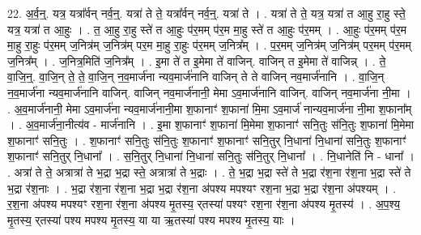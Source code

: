 \documentclass[17pt]{extarticle}
\begin{document}
22. अ॒र्व॒न्॒. यत्र॒ यत्रा᳚र्वन् नर्व॒न्॒. यत्रा॑ ते ते॒ यत्रा᳚र्वन् नर्व॒न्॒. यत्रा॑ ते । . यत्रा॑ ते ते॒ यत्र॒ यत्रा॑ त आ॒हु रा॒हु स्ते॒ यत्र॒ यत्रा॑ त आ॒हुः । . त॒ आ॒हु रा॒हु स्ते॑ त आ॒हुः प॑र॒मम् प॑र॒म मा॒हु स्ते॑ त आ॒हुः प॑र॒मम् । . आ॒हुः प॑र॒मम् प॑र॒म मा॒हु रा॒हुः प॑र॒मम् ज॒नित्र॑म् ज॒नित्र॑म् पर॒म मा॒हु रा॒हुः प॑र॒मम् ज॒नित्र᳚म् । . प॒र॒मम् ज॒नित्र॑म् ज॒नित्र॑म् पर॒मम् प॑र॒मम् ज॒नित्र᳚म् । . ज॒नित्र॒मिति॑ ज॒नित्र᳚म् । . इ॒मा ते॑ त इ॒मेमा ते॑ वाजिन्. वाजिन् त इ॒मेमा ते॑ वाजिन्न् । . ते॒ वा॒जि॒न्॒. वा॒जि॒न् ते॒ ते॒ वा॒जि॒न् न॒व॒मार्ज॑ना न्यव॒मार्ज॑नानि वाजिन् ते ते वाजिन् नव॒मार्ज॑नानि । . वा॒जि॒न् न॒व॒मार्ज॑ना न्यव॒मार्ज॑नानि वाजिन्. वाजिन् नव॒मार्ज॑नानी॒ मेमा ऽव॒मार्ज॑नानि वाजिन्. वाजिन् नव॒मार्ज॑ना नी॒मा । . अ॒व॒मार्ज॑नानी॒ मेमा ऽव॒मार्ज॑ना न्यव॒मार्ज॑नानी॒मा श॒फानाꣳ॑ श॒फाना॑ मि॒मा ऽव॒मार्ज॑
नान्यव॒मार्ज॑ना नी॒मा श॒फाना᳚म् । . अ॒व॒मार्ज॑ना॒नीत्य॑व - मार्ज॑नानि । . इ॒मा श॒फानाꣳ॑ श॒फाना॑ मि॒मेमा श॒फानाꣳ॑ सनि॒तुः स॑नि॒तुः श॒फाना॑ मि॒मेमा श॒फानाꣳ॑ सनि॒तुः । . श॒फानाꣳ॑ सनि॒तुः स॑नि॒तुः श॒फानाꣳ॑ श॒फानाꣳ॑ सनि॒तुर् नि॒धाना॑ नि॒धाना॑ सनि॒तुः श॒फानाꣳ॑ श॒फानाꣳ॑ सनि॒तुर् नि॒धाना᳚ । . स॒नि॒तुर् नि॒धाना॑ नि॒धाना॑ सनि॒तुः स॑नि॒तुर् नि॒धाना᳚ । . नि॒धानेति॑ नि - धाना᳚ । . अत्रा॑ ते ते॒ अत्रात्रा॑ ते भ॒द्रा भ॒द्रा स्ते॒ अत्रात्रा॑ ते भ॒द्राः । . ते॒ भ॒द्रा भ॒द्रा स्ते॑ ते भ॒द्रा र॑श॒ना र॑श॒ना भ॒द्रा स्ते॑ ते भ॒द्रा र॑श॒नाः । . भ॒द्रा र॑श॒ना र॑श॒ना भ॒द्रा भ॒द्रा र॑श॒ना अ॑पश्य मपश्यꣳ रश॒ना भ॒द्रा भ॒द्रा र॑श॒ना अ॑पश्यम् । . र॒श॒ना अ॑पश्य मपश्यꣳ रश॒ना र॑श॒ना अ॑पश्य मृ॒तस्य॒ र्‌तस्या॑ पश्यꣳ रश॒ना र॑श॒ना अ॑पश्य मृ॒तस्य॑ । . अ॒प॒श्य॒ मृ॒तस्य॒ र्‌तस्या॑ पश्य मपश्य मृ॒तस्य॒ या या ऋ॒तस्या॑ पश्य मपश्य मृ॒तस्य॒ याः । \newline
\end{document}

